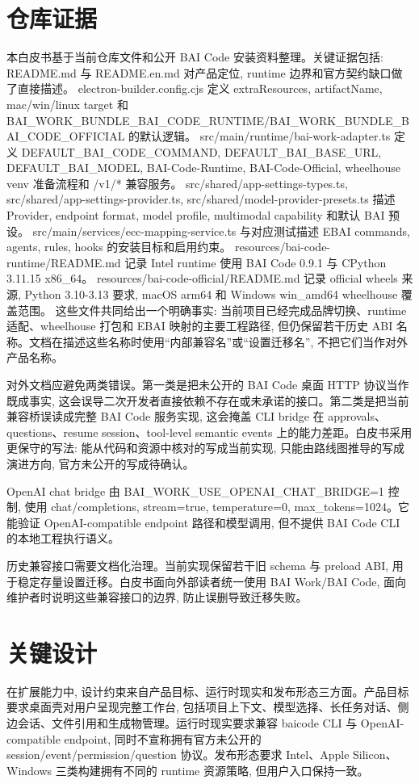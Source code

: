 \section{仓库证据}
本白皮书基于当前仓库文件和公开 BAI Code 安装资料整理。关键证据包括: README.md 与 README.en.md 对产品定位, runtime 边界和官方契约缺口做了直接描述。 electron-builder.config.cjs 定义 extraResources, artifactName, mac/win/linux target 和 BAI\_WORK\_BUNDLE\_BAI\_CODE\_RUNTIME/BAI\_WORK\_BUNDLE\_BAI\_CODE\_OFFICIAL 的默认逻辑。 src/main/runtime/bai-work-adapter.ts 定义 DEFAULT\_BAI\_CODE\_COMMAND, DEFAULT\_BAI\_BASE\_URL, DEFAULT\_BAI\_MODEL, BAI-Code-Runtime, BAI-Code-Official, wheelhouse venv 准备流程和 /v1/* 兼容服务。 src/shared/app-settings-types.ts, src/shared/app-settings-provider.ts, src/shared/model-provider-presets.ts 描述 Provider, endpoint format, model profile, multimodal capability 和默认 BAI 预设。 src/main/services/ecc-mapping-service.ts 与对应测试描述 EBAI commands, agents, rules, hooks 的安装目标和启用约束。 resources/bai-code-runtime/README.md 记录 Intel runtime 使用 BAI Code 0.9.1 与 CPython 3.11.15 x86\_64。 resources/bai-code-official/README.md 记录 official wheels 来源, Python 3.10-3.13 要求, macOS arm64 和 Windows win\_amd64 wheelhouse 覆盖范围。 这些文件共同给出一个明确事实: 当前项目已经完成品牌切换、runtime 适配、wheelhouse 打包和 EBAI 映射的主要工程路径, 但仍保留若干历史 ABI 名称。文档在描述这些名称时使用“内部兼容名”或“设置迁移名”, 不把它们当作对外产品名称。

对外文档应避免两类错误。第一类是把未公开的 BAI Code 桌面 HTTP 协议当作既成事实, 这会误导二次开发者直接依赖不存在或未承诺的接口。第二类是把当前兼容桥误读成完整 BAI Code 服务实现, 这会掩盖 CLI bridge 在 approvals、questions、resume session、tool-level semantic events 上的能力差距。白皮书采用更保守的写法: 能从代码和资源中核对的写成当前实现, 只能由路线图推导的写成演进方向, 官方未公开的写成待确认。

OpenAI chat bridge 由 BAI\_WORK\_USE\_OPENAI\_CHAT\_BRIDGE=1 控制, 使用 chat/completions, stream=true, temperature=0, max\_tokens=1024。它能验证 OpenAI-compatible endpoint 路径和模型调用, 但不提供 BAI Code CLI 的本地工程执行语义。

历史兼容接口需要文档化治理。当前实现保留若干旧 schema 与 preload ABI, 用于稳定存量设置迁移。白皮书面向外部读者统一使用 BAI Work/BAI Code, 面向维护者时说明这些兼容接口的边界, 防止误删导致迁移失败。

\section{关键设计}
在扩展能力中, 设计约束来自产品目标、运行时现实和发布形态三方面。产品目标要求桌面壳对用户呈现完整工作台, 包括项目上下文、模型选择、长任务对话、侧边会话、文件引用和生成物管理。运行时现实要求兼容 baicode CLI 与 OpenAI-compatible endpoint, 同时不宣称拥有官方未公开的 session/event/permission/question 协议。发布形态要求 Intel、Apple Silicon、Windows 三类构建拥有不同的 runtime 资源策略, 但用户入口保持一致。

